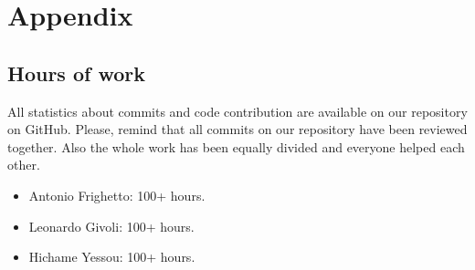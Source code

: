 \chapter*{Appendix}

\section*{Hours of work}
All statistics about commits and code contribution are available on our repository on GitHub. Please, remind that all commits on our repository have been reviewed together. Also the whole work has been equally divided and everyone helped each other.

\begin{itemize}
    \item Antonio Frighetto: 100+ hours.
    \item Leonardo Givoli: 100+ hours.
    \item Hichame Yessou: 100+ hours.
\end{itemize}